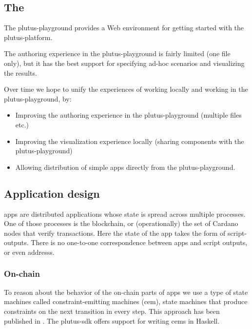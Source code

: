 \subsection{The }
\label{sec:plutus-playground}

The \gls{plutus-playground} provides a Web environment for getting started with the \gls{plutus-platform}.

The authoring experience in the \gls{plutus-playground} is fairly limited (one file only), but it has the best support for specifying ad-hoc scenarios and visualizing the results.

Over time we hope to unify the experiences of working locally and working in the \gls{plutus-playground}, by:
\begin{itemize}
\item Improving the authoring experience in the \gls{plutus-playground} (multiple files etc.)
\item Improving the visualization experience locally (sharing components with the \gls{plutus-playground})
\item Allowing distribution of simple \glspl{app} directly from the \gls{plutus-playground}.
\end{itemize}

\subsection{Application design}
\label{sec:application-design}


\glspl{app} are distributed applications whose state is spread across multiple processes.
One of those processes is the blockchain, or (operationally) the set of Cardano \glspl{node} that verify transactions.
Here the state of the \gls{app} takes the form of \glspl{script-output}.
There is no one-to-one correspondence between \glspl{app} and script outputs, or even \glspl{address}.

\subsubsection{On-chain}

To reason about the behavior of the on-chain parts of \glspl{app} we use a type of state machines called constraint-emitting machines (\gls{cem}), state machines that produce constraints on the next transition in every step.
This approach has been published in \cite{DBLP:conf/isola/Chakravarty0MMM20a}.
The \gls{plutus-sdk} offers support for writing \glspl{cem} in Haskell.

